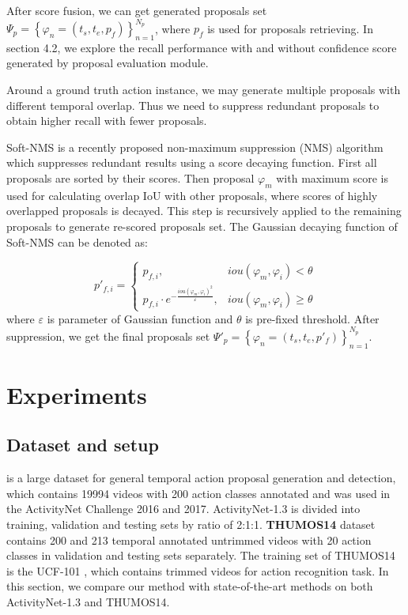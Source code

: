 \documentclass[runningheads]{llncs}
\begin{document}
After score fusion, we can get generated proposals set $\Psi_p  = \left \{ \varphi  _n=(t_s,t_e,p_{f}  ) \right \}_{n=1}^{N_p}$, where $p_{f}$ is used for proposals retrieving. In section 4.2, we explore the recall performance with and without confidence score generated by proposal evaluation module.

Around a ground truth action instance, we may generate multiple proposals with different temporal overlap. Thus we need to suppress redundant proposals to obtain higher recall with fewer proposals.

Soft-NMS \cite{softNMS} is a recently proposed non-maximum suppression (NMS) algorithm which suppresses redundant results using a score decaying function. First all proposals are sorted by their scores. Then proposal $\varphi_m$ with maximum score is used for calculating overlap IoU with other proposals, where scores of highly overlapped proposals is decayed. This step is recursively applied to the remaining proposals to  generate re-scored proposals set.
The Gaussian decaying function of Soft-NMS can be denoted  as:

\vspace{-0.05cm}
\begin{equation}
p'_{f,i}=\left\{\begin{matrix}
p_{f,i}, & iou(\varphi_m,\varphi_i)<\theta\\
p_{f,i}\cdot e^{-\frac{iou(\varphi_m,\varphi_i)^2}{\varepsilon }}, & iou(\varphi_m,\varphi_i)\geq \theta
\end{matrix}\right.
\end{equation}
where $\varepsilon $ is parameter of Gaussian function and $\theta$ is pre-fixed threshold.
After suppression, we get the final proposals set $\Psi'_p  = \left \{ \varphi  _n=(t_s,t_e,p'_f  ) \right \}_{n=1}^{N_p}$.



\section{Experiments}

\subsection{Dataset and setup}
 \cite{caba2015activitynet} is a large dataset for general temporal action proposal generation and detection, which contains 19994 videos   with 200 action classes annotated and was used in the ActivityNet Challenge 2016 and 2017. ActivityNet-1.3 is divided into training, validation and testing sets by ratio of 2:1:1.
{\bf THUMOS14} \cite{jiang2014thumos} dataset contains 200 and 213 temporal annotated untrimmed videos with 20 action classes in validation and testing sets separately. The training set of THUMOS14 is the UCF-101 \cite{soomro2012ucf101}, which contains trimmed videos for action recognition task.
In this section, we compare our method with state-of-the-art methods on both ActivityNet-1.3 and THUMOS14.%
\end{document}
